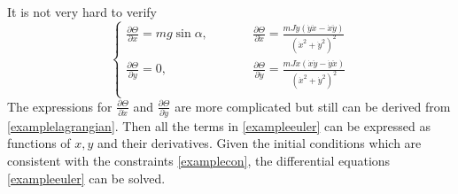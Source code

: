 \documentclass[preprint,11pt]{elsarticle}
\begin{document}
It is not very hard to verify
\begin{equation}
\left\{\begin{array}{ccc}
   \frac{\partial \Theta}{\partial x}= m g \sin\alpha,&\hspace{2em}&\frac{\partial \Theta}{\partial \ddot{x}}=\frac{m J \dot{y}(\dot{y}\ddot{x}-\dot{x}\ddot{y})}{(\dot{x}^2+\dot{y}^2)^2}\\[6pt]
   \frac{\partial \Theta}{\partial y}= 0 ,&\hspace{2em}& \frac{\partial \Theta}{\partial \ddot{y}}=\frac{m J \dot{x}(\dot{x}\ddot{y}-\dot{y}\ddot{x})}{(\dot{x}^2+\dot{y}^2)^2}\\
  \end{array}\right.
\end{equation}
The expressions for $\frac{\partial \Theta}{\partial \dot{x}}$ and $\frac{\partial \Theta}{\partial \dot{y}}$ are more complicated but still can be derived from \eqref{examplelagrangian}. Then all the terms in \eqref{exampleeuler} can be expressed as functions of $x, y$ and their derivatives.
Given the initial conditions which are consistent with the constraints \eqref{examplecon}, the differential equations \eqref{exampleeuler} can be solved.
\end{document}

